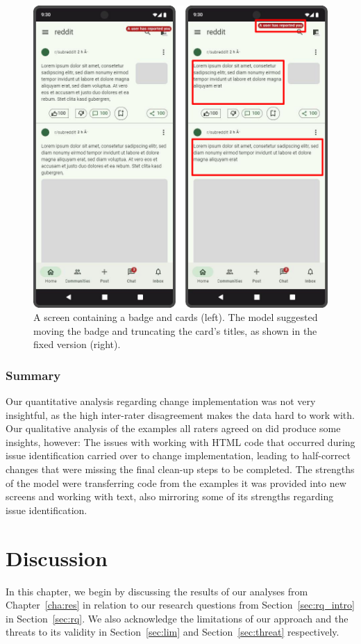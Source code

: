 \documentclass[11pt,titlepage,oneside,openany]{book}
\begin{document}
\begin{figure}[H]
	\centering
	\includegraphics[width=.56\textwidth]{figures/change_good_ex_ts_2.jpg}
	\caption{A screen containing a badge and cards (left). The model suggested moving the badge and truncating the card's titles, as shown in the fixed version (right).}
	\label{fig:change_good_ex_ts_2}
\end{figure}

\subsection{Summary}

Our quantitative analysis regarding change implementation was not very insightful, as the high inter-rater disagreement makes the data hard to work with. Our qualitative analysis of the examples all raters agreed on did produce some insights, however: The issues with working with HTML code that occurred during issue identification carried over to change implementation, leading to half-correct changes that were missing the final clean-up steps to be completed. The strengths of the model were transferring code from the examples it was provided into new screens and working with text, also mirroring some of its strengths regarding issue identification. 

\chapter{Discussion}

In this chapter, we begin by discussing the results of our analyses from Chapter~\ref{cha:res} in relation to our research questions from Section~\ref{sec:rq_intro} in Section~\ref{sec:rq}. We also acknowledge the limitations of our approach and the threats to its validity in Section~\ref{sec:lim} and Section~\ref{sec:threat} respectively.
\end{document}
